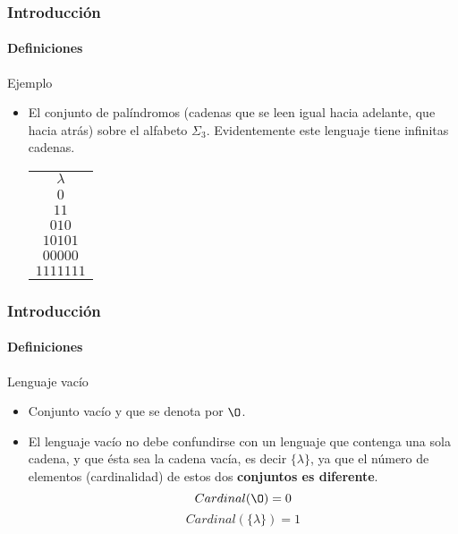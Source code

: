 \documentclass{beamer}
\begin{document}
        \begin{frame}
            \frametitle{Introducci\'on}
            \framesubtitle{Definiciones}

			\begin{exampleblock}{Ejemplo}
                \begin{itemize}
                    \item[\checkmark] El conjunto de pal\'indromos (cadenas que se leen igual hacia adelante, que hacia atr\'as) sobre el alfabeto $\Sigma_{3}$. Evidentemente este lenguaje tiene infinitas cadenas.
                    \begin{center}
                        \begin{tabular}{c}
                            $\lambda$ \\
                            $0$ \\
                            $11$ \\
                            $010$ \\
                            $10101$ \\
                            $00000$ \\
                            $1111111$ \\
                        \end{tabular}
                    \end{center}
                \end{itemize}
            \end{exampleblock}
		\end{frame}

        \begin{frame}
            \frametitle{Introducci\'on}
            \framesubtitle{Definiciones}

            \begin{block}{Lenguaje vac\'io}
                \begin{itemize}
                    \item[\checkmark] Conjunto vac\'io y que se denota por $\O$. 
                    \item[\checkmark] El lenguaje vac\'io no debe confundirse con un lenguaje que contenga una sola cadena, y que \'esta sea la cadena vac\'ia, es decir $\{\lambda\}$, ya que el n\'umero de elementos (cardinalidad) de estos dos \textbf{conjuntos es diferente}.
                    $$Cardinal (\O) = 0$$
                    $$Cardinal (\{\lambda\}) = 1$$
                \end{itemize}
			\end{block}
		\end{frame}
\end{document}
